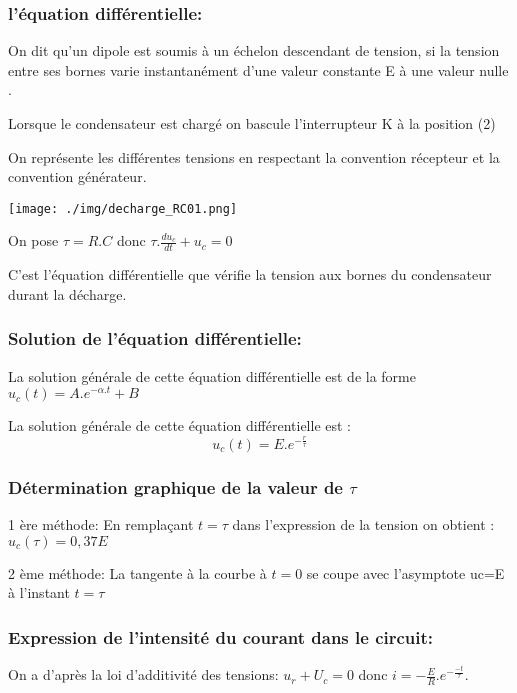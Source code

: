 \documentclass[12pt]{article}
\begin{document}
\subsubsection{l'équation différentielle:  }
On dit qu'un dipole est soumis à un échelon descendant de tension, si la tension entre ses bornes varie instantanément d'une
valeur constante E à une valeur nulle .

Lorsque le condensateur est chargé on bascule l'interrupteur K à la position (2)

On représente les différentes tensions en respectant la convention récepteur et la convention générateur.


\begin{center}

	\texttt{[image: ./img/decharge\_RC01.png]}
\end{center}

On pose $\tau = R.C$ donc $\tau.\frac{du_c}{dt} + u_c = 0$

C'est l'équation différentielle que vérifie la tension aux bornes du condensateur durant la décharge.

\subsubsection{Solution de l'équation différentielle: }

La solution générale de cette équation différentielle est de la forme $u_c(t) = A.e^{-\alpha .t} + B $

La solution générale de cette équation différentielle est : $$u_c(t) = E.e^{-\frac{r}{\tau}}$$

\subsubsection{Détermination graphique de la valeur de $\tau$}


1 ère méthode: En remplaçant $t = \tau$ dans l'expression de la tension on obtient : $u_c(\tau) =  0,37E$

2 ème méthode: La tangente à la courbe à $t=0$ se coupe avec l'asymptote uc=E à l'instant $t=\tau$

\subsubsection{Expression de l'intensité du courant dans le circuit: }

On a d'après la loi d'additivité des tensions: $u_r + U_c = 0$ donc $i = -\frac{E}{R}.e^{-\frac{-t}{\tau}}$.
\end{document}

